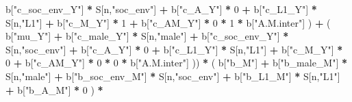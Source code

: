 \documentclass[
]{book}
\newenvironment{Shaded}{\begin{snugshade}}{\end{snugshade}}
\newcommand{\DecValTok}[1]{\textcolor[rgb]{0.00,0.00,0.81}{#1}}
\newcommand{\NormalTok}[1]{#1}
\newcommand{\SpecialCharTok}[1]{\textcolor[rgb]{0.81,0.36,0.00}{\textbf{#1}}}
\newcommand{\StringTok}[1]{\textcolor[rgb]{0.31,0.60,0.02}{#1}}
\begin{document}
\begin{Shaded}
\begin{Highlighting}[]
\NormalTok{                                 b[}\StringTok{"c\_soc\_env\_Y"}\NormalTok{] }\SpecialCharTok{*}\NormalTok{ S[n,}\StringTok{"soc\_env"}\NormalTok{] }\SpecialCharTok{+} 
\NormalTok{                                 b[}\StringTok{"c\_A\_Y"}\NormalTok{] }\SpecialCharTok{*} \DecValTok{0} \SpecialCharTok{+} 
\NormalTok{                                 b[}\StringTok{"c\_L1\_Y"}\NormalTok{] }\SpecialCharTok{*}\NormalTok{ S[n,}\StringTok{"L1"}\NormalTok{] }\SpecialCharTok{+}
\NormalTok{                                 b[}\StringTok{"c\_M\_Y"}\NormalTok{] }\SpecialCharTok{*} \DecValTok{1} \SpecialCharTok{+}
\NormalTok{                                 b[}\StringTok{"c\_AM\_Y"}\NormalTok{] }\SpecialCharTok{*} \DecValTok{0} \SpecialCharTok{*} \DecValTok{1} \SpecialCharTok{*}\NormalTok{ b[}\StringTok{"A.M.inter"}\NormalTok{] ) }\SpecialCharTok{+} 
\NormalTok{                             ( b[}\StringTok{"mu\_Y"}\NormalTok{] }\SpecialCharTok{+} 
\NormalTok{                                 b[}\StringTok{"c\_male\_Y"}\NormalTok{] }\SpecialCharTok{*}\NormalTok{ S[n,}\StringTok{"male"}\NormalTok{] }\SpecialCharTok{+} 
\NormalTok{                                 b[}\StringTok{"c\_soc\_env\_Y"}\NormalTok{] }\SpecialCharTok{*}\NormalTok{ S[n,}\StringTok{"soc\_env"}\NormalTok{] }\SpecialCharTok{+} 
\NormalTok{                                 b[}\StringTok{"c\_A\_Y"}\NormalTok{] }\SpecialCharTok{*} \DecValTok{0} \SpecialCharTok{+} 
\NormalTok{                                 b[}\StringTok{"c\_L1\_Y"}\NormalTok{] }\SpecialCharTok{*}\NormalTok{ S[n,}\StringTok{"L1"}\NormalTok{] }\SpecialCharTok{+}
\NormalTok{                                 b[}\StringTok{"c\_M\_Y"}\NormalTok{] }\SpecialCharTok{*} \DecValTok{0} \SpecialCharTok{+}
\NormalTok{                                 b[}\StringTok{"c\_AM\_Y"}\NormalTok{] }\SpecialCharTok{*} \DecValTok{0} \SpecialCharTok{*} \DecValTok{0} \SpecialCharTok{*}\NormalTok{ b[}\StringTok{"A.M.inter"}\NormalTok{] )) }\SpecialCharTok{*}
\NormalTok{      ( b[}\StringTok{"b\_M"}\NormalTok{] }\SpecialCharTok{+} 
\NormalTok{          b[}\StringTok{"b\_male\_M"}\NormalTok{] }\SpecialCharTok{*}\NormalTok{ S[n,}\StringTok{"male"}\NormalTok{] }\SpecialCharTok{+} 
\NormalTok{          b[}\StringTok{"b\_soc\_env\_M"}\NormalTok{] }\SpecialCharTok{*}\NormalTok{ S[n,}\StringTok{"soc\_env"}\NormalTok{] }\SpecialCharTok{+}
\NormalTok{          b[}\StringTok{"b\_L1\_M"}\NormalTok{] }\SpecialCharTok{*}\NormalTok{ S[n,}\StringTok{"L1"}\NormalTok{] }\SpecialCharTok{+}
\NormalTok{          b[}\StringTok{"b\_A\_M"}\NormalTok{] }\SpecialCharTok{*} \DecValTok{0}\NormalTok{ ) }\SpecialCharTok{*} 

\end{Highlighting}
\end{Shaded}
\end{document}
